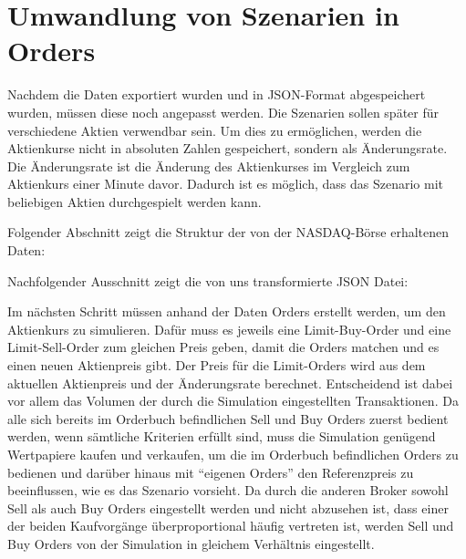 \section{Umwandlung von Szenarien in Orders}
Nachdem die Daten exportiert wurden und in JSON-Format abgespeichert wurden, müssen diese noch angepasst werden.
Die Szenarien sollen später für verschiedene Aktien verwendbar sein. Um dies zu ermöglichen, werden die Aktienkurse nicht in 
absoluten Zahlen gespeichert, sondern als Änderungsrate.
Die Änderungsrate ist die Änderung des Aktienkurses im Vergleich zum Aktienkurs einer Minute davor.
Dadurch ist es möglich, dass das Szenario mit beliebigen Aktien durchgespielt werden kann.

Folgender Abschnitt zeigt die Struktur der von der NASDAQ-Börse erhaltenen Daten:


\clearpage

Nachfolgender Ausschnitt zeigt die von uns transformierte JSON Datei:


Im nächsten Schritt müssen anhand der Daten Orders erstellt werden, um den Aktienkurs zu simulieren. Dafür muss es jeweils eine Limit-Buy-Order und eine Limit-Sell-Order zum gleichen Preis geben, damit die Orders matchen und es einen neuen Aktienpreis gibt. Der Preis für die Limit-Orders wird aus dem aktuellen Aktienpreis und der Änderungsrate berechnet. Entscheidend ist dabei vor allem das Volumen der durch die Simulation eingestellten Transaktionen. Da alle sich bereits im Orderbuch befindlichen Sell und Buy Orders zuerst bedient werden, wenn sämtliche Kriterien erfüllt sind, muss die Simulation genügend Wertpapiere kaufen und verkaufen, um die im Orderbuch befindlichen Orders zu bedienen und darüber hinaus mit \enquote{eigenen Orders} den Referenzpreis zu beeinflussen, wie es das Szenario vorsieht. Da durch die anderen Broker sowohl Sell als auch Buy Orders eingestellt werden und nicht abzusehen ist, dass einer der beiden Kaufvorgänge überproportional häufig vertreten ist, werden Sell und Buy Orders von der Simulation in gleichem Verhältnis eingestellt. 

